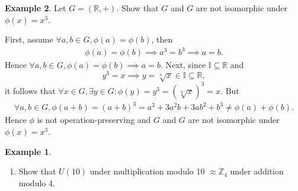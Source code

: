 \documentclass{article}
\theoremstyle{definition}
\newtheorem{example}{Example}[section]
\begin{document}
 \begin{example}
    Let $G = (\mathbb{R},+)$. Show that $G$ and $G$ are not isomorphic under $\phi(x) = x^3$.
    
    First, assume $\forall a,b \in G, \phi(a) = \phi(b)$, then
    \begin{align*}
        \phi(a) = \phi(b) \implies a^3 = b^3 \implies a = b.
    \end{align*}
    Hence $\forall a,b \in G, \phi(a) = \phi(b) \implies a=b$. Next, since $\mathbb{I} \subseteq \mathbb{R}$ and
    \begin{equation*}
        y^3 = x \implies y = \sqrt[3]{x} \in \mathbb{I} \subseteq \mathbb{R},
    \end{equation*}
    it follows that $\forall x \in G, \exists y \in G: \phi(y) = y^3 = (\sqrt[3]{x})^3 = x$. But
    \begin{align*}
        \forall a,b \in G, \phi(a+b) = (a+b)^3 = a^3 + 3a^2b + 3ab^2 + b^3 \neq \phi(a) + \phi(b).
    \end{align*}
    Hence $\phi$ is not operation-preserving and $G$ and $G$ are not isomorphic under $\phi(x)=x^3$.
    
    \begin{example}
    \begin{enumerate}
        \item Show that $U(10)$ under multiplication modulo 10 $\approx \mathbb{Z}_4$ under addition modulo 4.
        

\end{enumerate}
\end{example}
\end{example}
\end{document}
